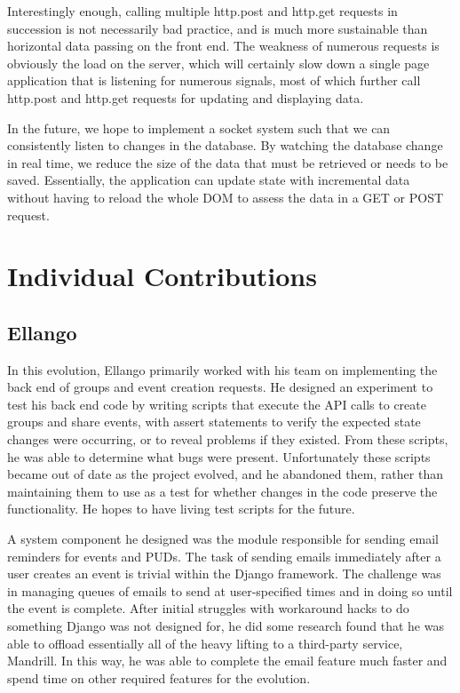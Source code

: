\documentclass[a4paper]{article}
\begin{document}
Interestingly enough, calling multiple http.post and http.get requests in succession is not necessarily bad practice, and is much more sustainable than horizontal data passing on the front end. The weakness of numerous requests is obviously the load on the server, which will certainly slow down a single page application that is listening for numerous signals, most of which further call http.post and http.get requests for updating and displaying data.

In the future, we hope to implement a socket system such that we can consistently listen to changes in the database. By watching the database change in real time, we reduce the size of the data that must be retrieved or needs to be saved. Essentially, the application can update state with incremental data without having to reload the whole DOM to assess the data in a GET or POST request.


\section{Individual Contributions}
\subsection{Ellango}
In this evolution, Ellango primarily worked with his team on implementing the back end of groups and event creation requests. He designed an experiment to test his back end code by writing scripts that execute the API calls to create groups and share events, with assert statements to verify the expected state changes were occurring, or to reveal problems if they existed. From these scripts, he was able to determine what bugs were present. Unfortunately these scripts became out of date as the project evolved, and he abandoned them, rather than maintaining them to use as a test for whether changes in the code preserve the functionality. He hopes to have living test scripts for the future.

A system component he designed was the module responsible for sending email reminders for events and PUDs. The task of sending emails immediately after a user creates an event is trivial within the Django framework. The challenge was in managing queues of emails to send at user-specified times and in doing so until the event is complete. After initial struggles with workaround hacks to do something Django was not designed for, he did some research found that he was able to offload essentially all of the heavy lifting to a third-party service, Mandrill. In this way, he was able to complete the email feature much faster and spend time on other required features for the evolution.
\end{document}
